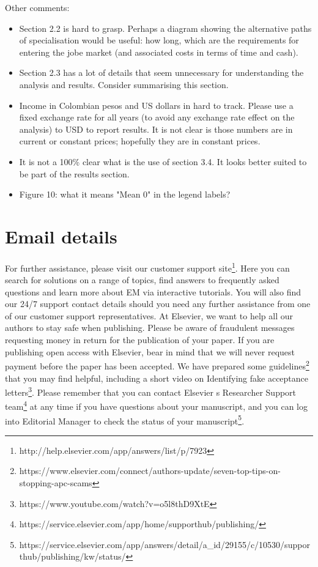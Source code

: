 \documentclass[12pt]{article}
\begin{document}
Other comments: 
\begin{itemize}
    \item Section 2.2 is hard to grasp. Perhaps a diagram showing the alternative paths of specialisation would be useful: how long, which are the requirements for entering the jobe market (and associated costs in terms of time and cash).
    \item Section 2.3 has a lot of details that seem unnecessary for understanding the analysis and results. Consider summarising this section.
    \item Income in Colombian pesos and US dollars in hard to track. Please use a fixed exchange rate for all years (to avoid any exchange rate effect on the analysis) to USD to report results. It is not clear is those numbers are in current or constant prices; hopefully they are in constant prices.
    \item It is not a 100\% clear what is the use of section 3.4. It looks better suited to be part of the results section.
    \item Figure 10: what it means "Mean 0" in the legend labels?
\end{itemize}

\section{Email details}

For further assistance, please visit our customer support site\footnote{http://help.elsevier.com/app/answers/list/p/7923}. Here you can search for solutions on a range of topics, find answers to frequently asked questions and learn more about EM via interactive tutorials. You will also find our 24/7 support contact details should you need any further assistance from one of our customer support representatives. At Elsevier, we want to help all our authors to stay safe when publishing. Please be aware of fraudulent messages requesting money in return for the publication of your paper. If you are publishing open access with Elsevier, bear in mind that we will never request payment before the paper has been accepted. We have prepared some guidelines\footnote{https://www.elsevier.com/connect/authors-update/seven-top-tips-on-stopping-apc-scams} that you may find helpful, including a short video on Identifying fake acceptance letters\footnote{https://www.youtube.com/watch?v=o5l8thD9XtE}. Please remember that you can contact Elsevier s Researcher Support team\footnote{https://service.elsevier.com/app/home/supporthub/publishing/} at any time if you have questions about your manuscript, and you can log into Editorial Manager to check the status of your manuscript\footnote{ https://service.elsevier.com/app/answers/detail/a\_id/29155/c/10530/supporthub/publishing/kw/status/}.



%
%
\end{document}
